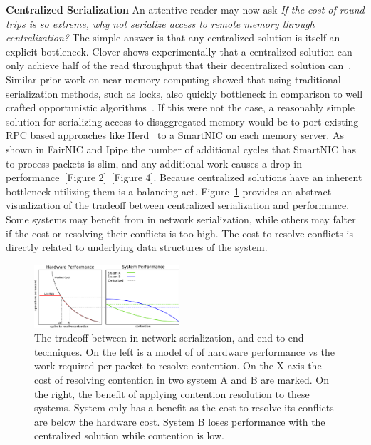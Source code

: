 

\textbf{Centralized Serialization} 
An attentive reader may now ask \textit{If the cost of round trips is so
extreme, why not serialize access to remote memory through centralization?} The
simple answer is that any centralized solution is itself an explicit bottleneck.
Clover shows experimentally that a centralized solution can only achieve half of
the read throughput that their decentralized solution can~\cite{clover}. Similar
prior work on near memory computing showed that using traditional serialization
methods, such as locks, also quickly bottleneck in comparison to well crafted
opportunistic algorithms~\cite{near-memory-structs}.  If this were not the case,
a reasonably simple solution for serializing access to disaggregated memory
would be to port existing RPC based approaches like Herd~\cite{herd} to a
SmartNIC on each memory server. As shown in FairNIC and Ipipe the number of
additional cycles that SmartNIC has to process packets is slim, and any
additional work causes a drop in performance~\cite{fairnic}[Figure
2]~\cite{ipipe}[Figure 4]. Because centralized solutions have an inherent
bottleneck utilizing them is a balancing act. Figure~\ref{fig:middlebox_model}
provides an abstract visualization of the tradeoff between centralized
serialization and performance. Some systems may benefit from in network
serialization, while others may falter if the cost or resolving their conflicts
is too high. The cost to resolve conflicts is directly related to underlying
data structures of the system.

\begin{figure}
    \includegraphics[width=0.48\textwidth]{fig/in_network_tradeoff.pdf}

    \caption{The tradeoff between in network serialization, and end-to-end
    techniques. On the left is a model of of hardware performance vs the work
    required per packet to resolve contention. On the X axis the cost of
    resolving contention in two system A and B are marked. On the right, the
    benefit of applying contention resolution to these systems. System only has
    a benefit as the cost to resolve its conflicts are below the hardware cost.
    System B loses performance with the centralized solution while contention is
    low.}

    \label{fig:middlebox_model}
\end{figure}


